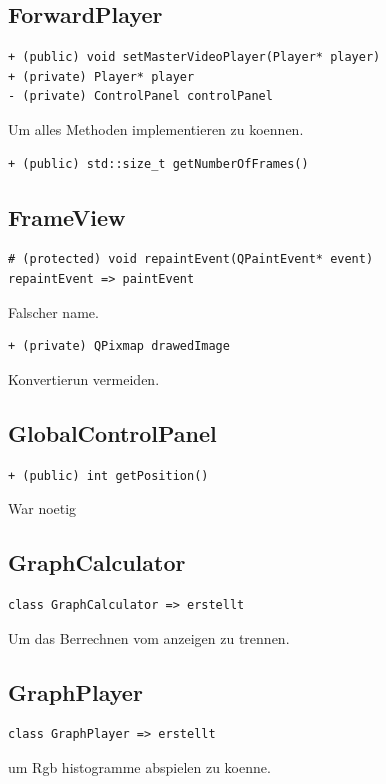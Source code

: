 \documentclass[parskip=full]{scrartcl}
\begin{document}
\subsection{ForwardPlayer}
\begin{verbatim}
+ (public) void setMasterVideoPlayer(Player* player)
+ (private) Player* player
- (private) ControlPanel controlPanel
\end{verbatim}
Um alles Methoden implementieren zu koennen.
\begin{verbatim}
+ (public) std::size_t getNumberOfFrames()
\end{verbatim}
\subsection{FrameView}
\begin{verbatim}
# (protected) void repaintEvent(QPaintEvent* event)
repaintEvent => paintEvent
\end{verbatim}
Falscher name.
\begin{verbatim}
+ (private) QPixmap drawedImage
\end{verbatim}
Konvertierun vermeiden.
\subsection{GlobalControlPanel}
\begin{verbatim}
+ (public) int getPosition()
\end{verbatim}
War noetig
\subsection{GraphCalculator}
\begin{verbatim}
class GraphCalculator => erstellt
\end{verbatim}
Um das Berrechnen vom anzeigen zu trennen.
\subsection{GraphPlayer}
\begin{verbatim}
class GraphPlayer => erstellt
\end{verbatim}
um Rgb histogramme abspielen zu koenne.
\end{document}
